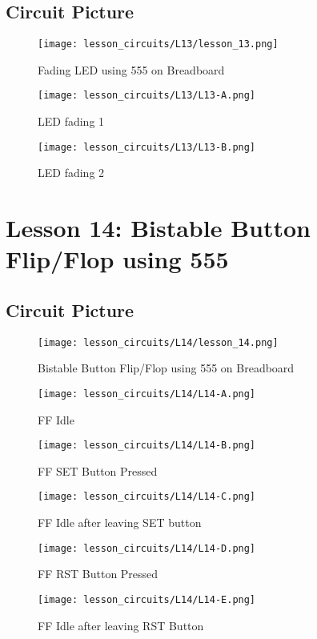 \subsection{Circuit Picture}
\begin{figure}[htp]
    \centering
    \texttt{[image: lesson\_circuits/L13/lesson\_13.png]}
    \caption{Fading LED using 555 on Breadboard}
    \label{fig:555_fled_sch}
\end{figure}
\begin{figure}[htp]
    \centering
    \texttt{[image: lesson\_circuits/L13/L13-A.png]}
    \caption{LED fading 1}
    \label{fig:555_fled_obb}
\end{figure}
\begin{figure}[htp]
    \centering
    \texttt{[image: lesson\_circuits/L13/L13-B.png]}
    \caption{LED fading 2}
    \label{fig:555_fled_obb1}
\end{figure}
\section{Lesson 14: Bistable Button Flip/Flop using 555}
\subsection{Circuit Picture}
\begin{figure}[htp]
    \centering
    \texttt{[image: lesson\_circuits/L14/lesson\_14.png]}
    \caption{Bistable Button Flip/Flop using 555 on Breadboard}
    \label{fig:555_ff_sch}
\end{figure}
\begin{figure}[htp]
    \centering
    \texttt{[image: lesson\_circuits/L14/L14-A.png]}
    \caption{FF Idle}
    \label{fig:555_ff_obb}
\end{figure}
\begin{figure}[htp]
    \centering
    \texttt{[image: lesson\_circuits/L14/L14-B.png]}
    \caption{FF SET Button Pressed}
    \label{fig:555_ff_obb1}
\end{figure}
\begin{figure}[htp]
    \centering
    \texttt{[image: lesson\_circuits/L14/L14-C.png]}
    \caption{FF Idle after leaving SET button}
    \label{fig:555_ff_obb2}
\end{figure}
\begin{figure}[htp]
    \centering
    \texttt{[image: lesson\_circuits/L14/L14-D.png]}
    \caption{FF RST Button Pressed}
    \label{fig:555_ff_obb3}
\end{figure}
\begin{figure}[htp]
    \centering
    \texttt{[image: lesson\_circuits/L14/L14-E.png]}
    \caption{FF Idle after leaving RST Button}
    \label{fig:555_ff_obb4}
\end{figure}

